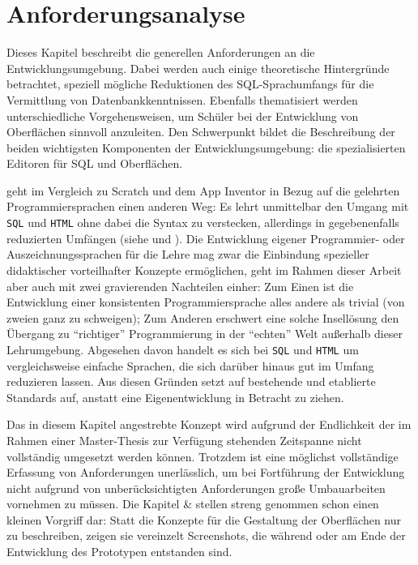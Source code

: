 \section{Anforderungsanalyse}
\label{sec:requirements}

Dieses Kapitel beschreibt die generellen Anforderungen an die Entwicklungsumgebung. Dabei werden auch einige theoretische Hintergründe betrachtet, speziell mögliche Reduktionen des SQL-Sprachumfangs für die Vermittlung von Datenbankkenntnissen. Ebenfalls thematisiert werden unterschiedliche Vorgehensweisen, um Schüler bei der Entwicklung von Oberflächen sinnvoll anzuleiten. Den Schwerpunkt bildet die Beschreibung der beiden wichtigsten Komponenten der Entwicklungsumgebung: die spezialisierten Editoren für SQL und Oberflächen.


\idename{} geht im Vergleich zu Scratch und dem App Inventor in Bezug auf die gelehrten Programmiersprachen einen anderen Weg: Es lehrt unmittelbar den Umgang mit \texttt{SQL} und \texttt{HTML} ohne dabei die Syntax zu verstecken, allerdings in gegebenenfalls reduzierten Umfängen (siehe  und ). Die Entwicklung eigener Programmier- oder Auszeichnungssprachen für die Lehre mag zwar die Einbindung spezieller didaktischer vorteilhafter Konzepte ermöglichen, geht im Rahmen dieser Arbeit aber auch mit zwei gravierenden Nachteilen einher: Zum Einen ist die Entwicklung einer konsistenten Programmiersprache alles andere als trivial (von zweien ganz zu schweigen); Zum Anderen erschwert eine solche Insellösung den Übergang zu "`richtiger"' Programmierung in der "`echten"' Welt außerhalb dieser Lehrumgebung. Abgesehen davon handelt es sich bei \texttt{SQL} und \texttt{HTML} um vergleichsweise einfache Sprachen, die sich darüber hinaus gut im Umfang reduzieren lassen. Aus diesen Gründen setzt \idename{} auf bestehende und etablierte Standards auf, anstatt eine Eigenentwicklung in Betracht zu ziehen.

Das in diesem Kapitel angestrebte Konzept wird aufgrund der Endlichkeit der im Rahmen einer Master-Thesis zur Verfügung stehenden Zeitspanne nicht vollständig umgesetzt werden können. Trotzdem ist eine möglichst vollständige Erfassung von Anforderungen unerlässlich, um bei Fortführung der Entwicklung nicht aufgrund von unberücksichtigten Anforderungen große Umbauarbeiten vornehmen zu müssen. Die Kapitel  \&  stellen streng genommen schon einen kleinen Vorgriff dar: Statt die Konzepte für die Gestaltung der Oberflächen nur zu beschreiben, zeigen sie vereinzelt Screenshots, die während oder am Ende der Entwicklung des Prototypen entstanden sind.

